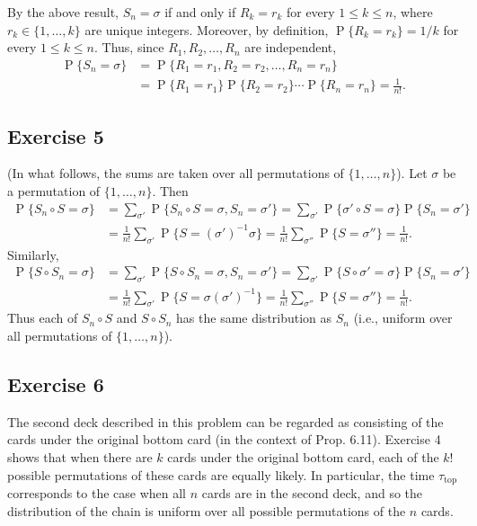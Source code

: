 \documentclass[12pt]{article}
\DeclareMathOperator{\Prob}{P}
\begin{document}
\begin{enumerate}[label=(\alph*)]
By the above result, $S_n = \sigma$ if and only if $R_k = r_k$ for every $1 \leq k \leq n$, where $r_k \in \{1, \ldots, k\}$ are unique integers. Moreover, by definition, $\Prob\{R_k = r_k\} = 1/k$ for every $1 \leq k \leq n$. Thus, since $R_1, R_2, \ldots, R_n$ are independent,
\begin{align*}
\Prob\{S_n = \sigma\} &= \Prob\{R_1 = r_1, R_2 = r_2, \ldots, R_n = r_n\} \\
&= \Prob\{R_1 = r_1\} \Prob\{R_2 = r_2\} \cdots \Prob\{R_n = r_n\} = \frac{1}{n!}.
\end{align*}

\subsection*{Exercise 5}

(In what follows, the sums are taken over all permutations of $\{1, \ldots, n\}$). Let $\sigma$ be a permutation of $\{1, \ldots, n\}$. Then
\begin{align*}
\Prob\{S_n \circ S = \sigma\} &= \sum_{\sigma'} \Prob\{S_n \circ S = \sigma, S_n = \sigma'\} = \sum_{\sigma'} \Prob\{\sigma' \circ S = \sigma\} \Prob\{S_n = \sigma'\} \\
&= \frac{1}{n!} \sum_{\sigma'} \Prob\{S = (\sigma')^{-1}\sigma\} = \frac{1}{n!} \sum_{\sigma''} \Prob\{S = \sigma''\} = \frac{1}{n!}.
\end{align*}
Similarly,
\begin{align*}
\Prob\{S \circ S_n = \sigma\} &= \sum_{\sigma'} \Prob\{S \circ S_n = \sigma, S_n = \sigma'\} = \sum_{\sigma'} \Prob\{S \circ \sigma' = \sigma\} \Prob\{S_n = \sigma'\} \\
&= \frac{1}{n!} \sum_{\sigma'} \Prob\{S = \sigma(\sigma')^{-1}\} = \frac{1}{n!} \sum_{\sigma''} \Prob\{S = \sigma''\} = \frac{1}{n!}.
\end{align*}
Thus each of $S_n \circ S$ and $S \circ S_n$ has the same distribution as $S_n$ (i.e., uniform over all permutations of $\{1, \ldots, n\}$).

\subsection*{Exercise 6}

The second deck described in this problem can be regarded as consisting of the cards under the original bottom card (in the context of Prop. 6.11). Exercise 4 shows that when there are $k$ cards under the original bottom card, each of the $k!$ possible permutations of these cards are equally likely. In particular, the time $\tau_\mathrm{top}$ corresponds to the case when all $n$ cards are in the second deck, and so the distribution of the chain is uniform over all possible permutations of the $n$ cards.

\end{enumerate}
\end{document}
